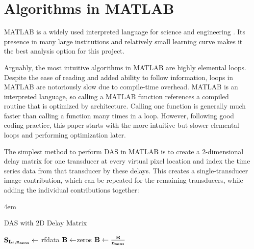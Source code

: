 \section{Algorithms in MATLAB}
\label{chapter3:matlab_code}

    MATLAB is a widely used interpreted language for science and engineering \cite{BriefHistoryMATLAB}. Its presence in many large institutions and relatively small learning curve makes it the best analysis option for this project.

    Arguably, the most intuitive algorithms in MATLAB are highly elemental loops. Despite the ease of reading and added ability to follow information, loops in MATLAB are notoriously slow due to compile-time overhead. MATLAB is an interpreted language, so calling a MATLAB function references a compiled routine that is optimized by architecture. Calling one function is generally much faster than calling a function many times in a loop. However, following good coding practice, this paper starts with the more intuitive but slower elemental loops and performing optimization later.

    The simplest method to perform DAS in MATLAB is to create a 2-dimensional delay matrix for one transducer at every virtual pixel location and index the time series data from that transducer by these delays. This creates a single-transducer image contribution, which can be repeated for the remaining transducers, while adding the individual contributions together:
    \\

    \begin{algorithm} [H]
    \parindent4em
    \normalem
    \caption{DAS with 2D Delay Matrix}\label{algo:basic_das}
        $\bf{S}_{L_f,n_{sens}} \gets$ rfdata\;
        $\bf{B} \gets $zeros\;
        $\bf{B} \gets \frac{\bf{B}}{n_{sens}}$\;
    \end{algorithm}

